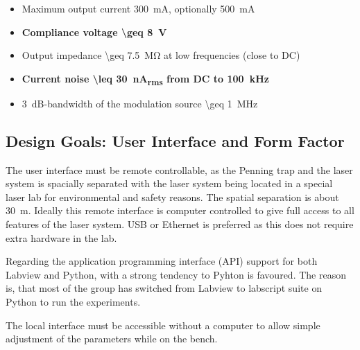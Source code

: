 \begin{center}
    \begin{tcolorbox}[
        new/auto counter,
        new/number within=chapter,
        colback=red!5!white,
        colframe=red!75!black,
        title=Current source specifications,
        width=0.8\linewidth,
        label={lst:dgDrive_specs_electrical}
        ]
    \begin{itemize}
        \item Maximum output current \qty{300}{\mA}, optionally \qty{500}{\mA}
        \item \textbf{Compliance voltage \qty[text-series-to-math, reset-text-series = false, reset-math-version = false]{\geq 8}{\V}}
        \item Output impedance \qty{\geq 7.5}{\mega \ohm} at low frequencies (close to DC)
        \item \textbf{Current noise \qty[text-series-to-math, reset-text-series = false, reset-math-version = false]{\leq 30}{\nA_{rms}} from DC to \qty[text-series-to-math, reset-text-series = false, reset-math-version = false]{100}{\kHz}}
        \item \qty{3}{\dB}-bandwidth of the modulation source \qty{\geq 1}{\MHz}
    \end{itemize}
    \end{tcolorbox}
\end{center}

\clearpage
\subsection{Design Goals: User Interface and Form Factor}
The user interface must be remote controllable, as the Penning trap and the laser system is spacially separated with the laser system being located in a special laser lab for environmental and safety reasons. The spatial separation is about \qty{30}{\meter}. Ideally this remote interface is computer controlled to give full access to all features of the laser system. USB or Ethernet is preferred as this does not require extra hardware in the lab.

Regarding the application programming interface (API) support for both Labview and Python, with a strong tendency to Pyhton is favoured. The reason is, that most of the group has switched from Labview to labscript suite \cite{labscript_2013} on Python to run the experiments.

The local interface must be accessible without a computer to allow simple adjustment of the parameters while on the bench.

